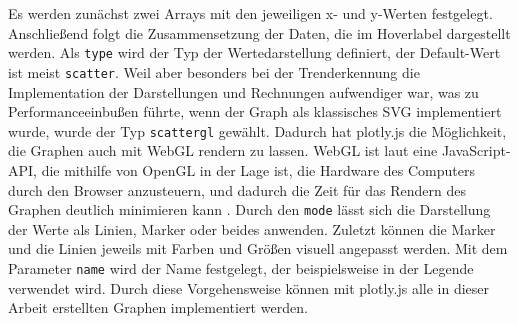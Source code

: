 Es werden zunächst zwei Arrays mit den jeweiligen x- und y-Werten festgelegt. Anschließend folgt die Zusammensetzung der Daten, die im Hoverlabel dargestellt werden. Als \texttt{type} wird der Typ der Wertedarstellung definiert, der Default-Wert ist meist \texttt{scatter}. Weil aber besonders bei der Trenderkennung die Implementation der Darstellungen und Rechnungen aufwendiger war, was zu Performanceeinbußen führte, wenn der Graph als klassisches SVG implementiert wurde, wurde der Typ \texttt{scattergl} gewählt. Dadurch hat plotly.js die Möglichkeit, die Graphen auch mit WebGL rendern zu lassen. WebGL ist laut \cite{MDNcontributors.2024b} eine JavaScript-API, die mithilfe von OpenGL in der Lage ist, die Hardware des Computers durch den Browser anzusteuern, und dadurch die Zeit für das Rendern des Graphen deutlich minimieren kann \cite{Plotly.2024b}. Durch den \texttt{mode} lässt sich die Darstellung der Werte als Linien, Marker oder beides anwenden. Zuletzt können die Marker und die Linien jeweils mit Farben und Größen visuell angepasst werden. Mit dem Parameter \texttt{name} wird der Name festgelegt, der beispielsweise in der Legende verwendet wird. 
Durch diese Vorgehensweise können mit plotly.js alle in dieser Arbeit erstellten Graphen implementiert werden.

